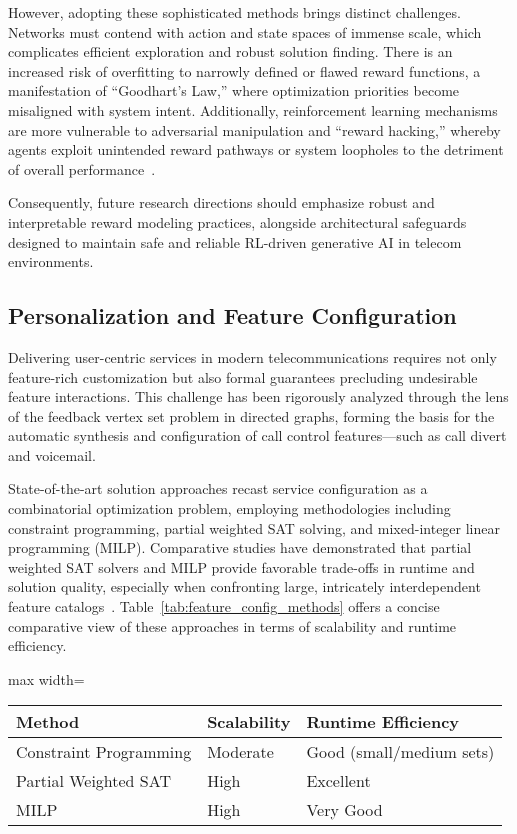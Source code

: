 \documentclass[sigconf]{acmart}
\begin{document}
However, adopting these sophisticated methods brings distinct challenges. Networks must contend with action and state spaces of immense scale, which complicates efficient exploration and robust solution finding. There is an increased risk of overfitting to narrowly defined or flawed reward functions, a manifestation of ``Goodhart’s Law,'' where optimization priorities become misaligned with system intent. Additionally, reinforcement learning mechanisms are more vulnerable to adversarial manipulation and ``reward hacking,'' whereby agents exploit unintended reward pathways or system loopholes to the detriment of overall performance~\cite{ref1}.

Consequently, future research directions should emphasize robust and interpretable reward modeling practices, alongside architectural safeguards designed to maintain safe and reliable RL-driven generative AI in telecom environments.

\subsection{Personalization and Feature Configuration}

Delivering user-centric services in modern telecommunications requires not only feature-rich customization but also formal guarantees precluding undesirable feature interactions. This challenge has been rigorously analyzed through the lens of the feedback vertex set problem in directed graphs, forming the basis for the automatic synthesis and configuration of call control features—such as call divert and voicemail.

State-of-the-art solution approaches recast service configuration as a combinatorial optimization problem, employing methodologies including constraint programming, partial weighted SAT solving, and mixed-integer linear programming (MILP). Comparative studies have demonstrated that partial weighted SAT solvers and MILP provide favorable trade-offs in runtime and solution quality, especially when confronting large, intricately interdependent feature catalogs~\cite{ref31}. Table~\ref{tab:feature_config_methods} offers a concise comparative view of these approaches in terms of scalability and runtime efficiency.

\begin{table*}[htbp]
\centering
\caption{Comparison of Feature Configuration Optimization Approaches}
\label{tab:feature_config_methods}
\begin{adjustbox}{max width=\textwidth}
\begin{tabular}{lll}
\toprule
\textbf{Method} & \textbf{Scalability} & \textbf{Runtime Efficiency} \\
\midrule
Constraint Programming     & Moderate         & Good (small/medium sets)   \\
Partial Weighted SAT       & High             & Excellent                  \\
MILP                      & High             & Very Good                  \\
\bottomrule
\end{tabular}
\end{adjustbox}
\end{table*}
\end{document}
